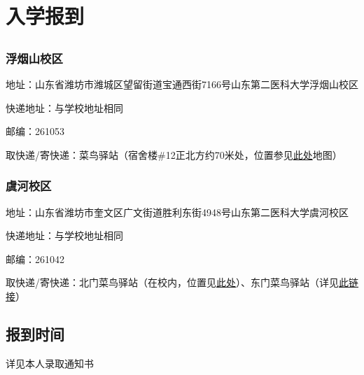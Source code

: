 \section[入学报到]{入学报到}

\subsection[地址与快递]{}
\subsubsection[浮烟山校区]{浮烟山校区}
地址：山东省潍坊市潍城区望留街道宝通西街7166号山东第二医科大学浮烟山校区

快递地址：与学校地址相同

邮编：261053

取快递/寄快递：菜鸟驿站（宿舍楼\#12正北方约70米处，位置参见\hyperref[map_fuyanshan_holistic]{此处}地图）\footnotemark
{}

\subsubsection[虞河校区]{虞河校区}
地址：山东省潍坊市奎文区广文街道胜利东街4948号山东第二医科大学虞河校区

快递地址：与学校地址相同

邮编：261042

取快递/寄快递：北门菜鸟驿站（在校内，位置见\hyperref[map_yuhe_holistic]{此处}）、东门菜鸟驿站（详见\hyperref[common_locations_yuhe]{此链接}）\footnotemark
{}

\subsection[报到时间]{报到时间}
详见本人录取通知书


